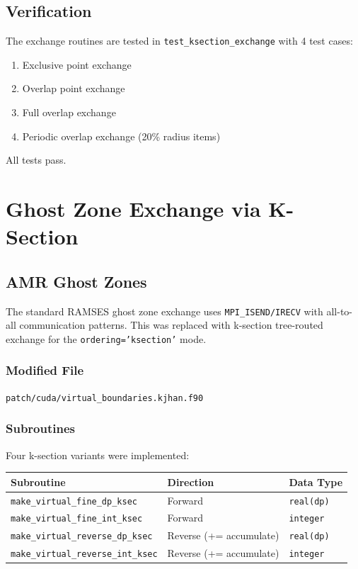 \documentclass[11pt,fleqn]{book}
\begin{document}
\section{Verification}

The exchange routines are tested in \texttt{test\_ksection\_exchange} with 4 test cases:
\begin{enumerate}
  \item Exclusive point exchange
  \item Overlap point exchange
  \item Full overlap exchange
  \item Periodic overlap exchange (20\% radius items)
\end{enumerate}
All tests pass.


\chapter{Ghost Zone Exchange via K-Section}

\section{AMR Ghost Zones}

The standard RAMSES ghost zone exchange uses \texttt{MPI\_ISEND/IRECV} with all-to-all communication patterns. This was replaced with k-section tree-routed exchange for the \texttt{ordering='ksection'} mode.

\subsection{Modified File}

\texttt{patch/cuda/virtual\_boundaries.kjhan.f90}

\subsection{Subroutines}

Four k-section variants were implemented:

\begin{center}
\begin{tabular}{lll}
\toprule
\textbf{Subroutine} & \textbf{Direction} & \textbf{Data Type} \\
\midrule
\texttt{make\_virtual\_fine\_dp\_ksec} & Forward & \texttt{real(dp)} \\
\texttt{make\_virtual\_fine\_int\_ksec} & Forward & \texttt{integer} \\
\texttt{make\_virtual\_reverse\_dp\_ksec} & Reverse (+= accumulate) & \texttt{real(dp)} \\
\texttt{make\_virtual\_reverse\_int\_ksec} & Reverse (+= accumulate) & \texttt{integer} \\
\bottomrule
\end{tabular}
\end{center}
\end{document}
